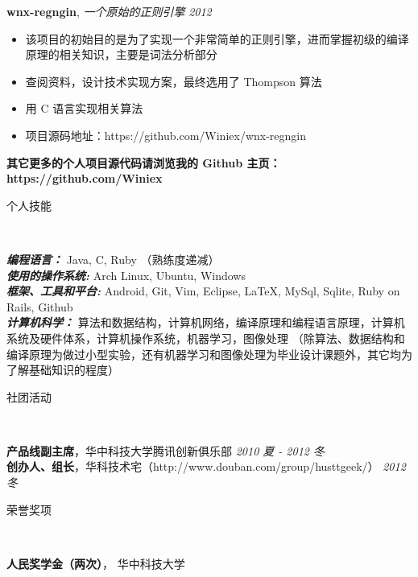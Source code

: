 \documentclass[9pt]{ctexart}
\newenvironment{changemargin}[2]{%
    \begin{list}{}{%
            \setlength{\topsep}{0pt}%
            \setlength{\leftmargin}{#1}%
            \setlength{\rightmargin}{#2}%
            \setlength{\listparindent}{\parindent}%
        \setlength{\itemindent}{\parindent}%
            \setlength{\parsep}{\parskip}%
        }%
  \item[]}{\end{list}
      }
\newcommand{\lineover}{
          \begin{changemargin}{-0.05in}{-0.05in}
              \vspace*{-8pt}
              \hrulefill \\
              \vspace*{-2pt}
          \end{changemargin}
      }
\newcommand{\header}[1]{
          \begin{changemargin}{-0.5in}{-0.5in}
              \scshape{#1}\\
              \lineover
          \end{changemargin}
      }
\newenvironment{body} {
          \vspace*{-16pt}
          \begin{changemargin}{-0.25in}{-0.5in}
          }	
      {\end{changemargin}
      }
\begin{document}
\begin{body}
          \vspace*{-4pt}
          \textbf {wnx-regngin}, \emph{一个原始的正则引擎} \hfill \emph{2012}\\
      \begin{itemize} \itemsep -0pt
              \item 该项目的初始目的是为了实现一个非常简单的正则引擎，进而掌握初级的编译原理的相关知识，主要是词法分析部分
              \item 查阅资料，设计技术实现方案，最终选用了 Thompson 算法
              \item 用 C 语言实现相关算法
              \item 项目源码地址：https://github.com/Winiex/wnx-regngin
          \end{itemize}

          \vspace*{-4pt}
          \textbf {其它更多的个人项目源代码请浏览我的 Github 主页：https://github.com/Winiex}
      \end{body}

      \smallskip

      \header{个人技能}

      \begin{body}
          \vspace{14pt}
          \emph{\textbf{编程语言：}}{} Java, C, Ruby （熟练度递减）\\
          \medskip
          \emph{\textbf{使用的操作系统:}}{} Arch Linux, Ubuntu, Windows \\
          \medskip
          \emph{\textbf{框架、工具和平台:}}{} Android, Git, Vim, Eclipse, \LaTeX, MySql, Sqlite, Ruby on Rails, Github \\
          \medskip
          \emph{\textbf{计算机科学：}}{} 算法和数据结构，计算机网络，编译原理和编程语言原理，计算机系统及硬件体系，计算机操作系统，机器学习，图像处理 （除算法、数据结构和编译原理为做过小型实验，还有机器学习和图像处理为毕业设计课题外，其它均为了解基础知识的程度）

      \end{body}

      \smallskip


      \header{社团活动}

      \begin{body}
          \vspace{14pt}
          \textbf{产品线副主席}，华中科技大学腾讯创新俱乐部 \hfill {} \emph{2010 夏 - 2012 冬}\\
          \textbf{创办人、组长}，华科技术宅（http://www.douban.com/group/husttgeek/） \hfill {} \emph{2012 冬}\\
      \end{body}

      \smallskip


      \header{荣誉奖项}

      \begin{body}
          \vspace{14pt}
          \textbf{人民奖学金（两次）}， 华中科技大学\\
          \smallskip
      \end{body}

      
\end{document}
